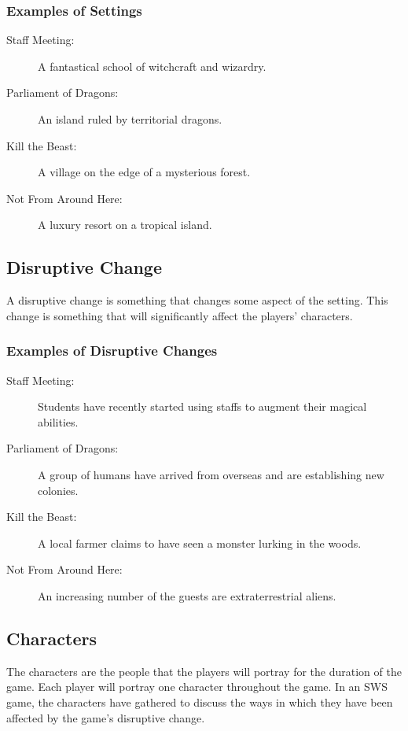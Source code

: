 \documentclass[12pt, a5paper, parskip=half-, footheight=1.4cm]{scrartcl}
\begin{document}
\subsubsection*{Examples of Settings}
\begin{description}
\item[Staff Meeting:] A fantastical school of witchcraft and wizardry.
\item[Parliament of Dragons:] An island ruled by territorial dragons.
\item[Kill the Beast:] A village on the edge of a mysterious forest.
\item[Not From Around Here:] A luxury resort on a tropical island.
\end{description}

\newpage

\subsection*{Disruptive Change}
A disruptive change is something that changes some aspect of the setting.
This change is something that will significantly affect the players' characters.

\subsubsection*{Examples of Disruptive Changes}
\begin{description}
\item[Staff Meeting:] Students have recently started using staffs to augment their magical abilities.
\item[Parliament of Dragons:] A group of humans have arrived from overseas and are establishing new colonies.
\item[Kill the Beast:] A local farmer claims to have seen a monster lurking in the woods.
\item[Not From Around Here:] An increasing number of the guests are extraterrestrial aliens.
\end{description}

\newpage

\subsection*{Characters}
The characters are the people that the players will portray for the duration of the game.
Each player will portray one character throughout the game.
In an SWS game, the characters have gathered to discuss the ways in which they have been affected by the game's disruptive change.
\end{document}
